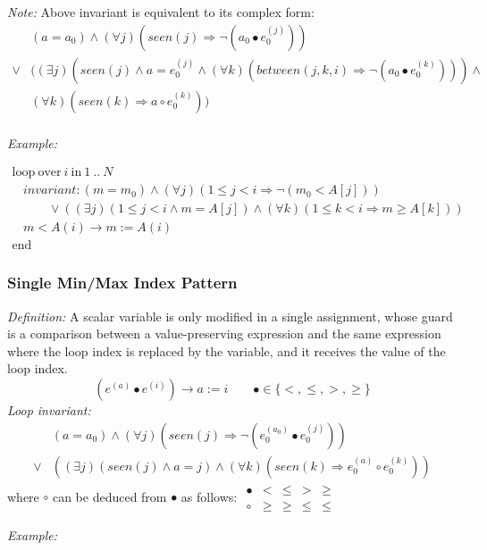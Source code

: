\documentclass[a4paper,10pt]{article}
\newcommand{\idx}{\ensuremath{i}\xspace}
\newcommand{\at}[1]{{(#1)}}
\newcommand{\KWloop}{\ensuremath{\mathrm{loop}~}}
\newcommand{\KWend}{\ensuremath{\mathrm{end}~}}
\newcommand{\KWover}{\ensuremath{\mathrm{over}~}}
\newcommand{\KWin}{\ensuremath{~\mathrm{in}~}}
\newcommand{\impl}{\ensuremath{\Longrightarrow}}
\newcommand{\seen}[1]{\ensuremath{\mathit{seen}(#1)}\xspace}
\newcommand{\between}[3]{\ensuremath{\mathit{between}{(#1,#2,#3)}}\xspace}
\newcommand{\loopinvariant}{\noindent\textit{Loop invariant:}\xspace}
\newcommand{\patterndef}{\noindent\textit{Definition:}\xspace}
\newcommand{\patternexample}{\noindent\textit{Example:}\xspace}
\newcommand{\patternnote}{\noindent\textit{Note:}\xspace}
\begin{document}
\bigskip
\patternnote Above invariant is equivalent to its complex form:
\begin{eqnarray*}
&(a = a_0) \land (\forall j)(\seen{j} \impl \neg (a_0 \bullet e_0^\at{j}))\\
\lor 
& ((\exists j)(\seen{j} \land a = e_0^\at{j} \land (\forall k)(\between{j}{k}{i} \impl \neg (a_0 \bullet e_0^\at{k}))) \land \\
&(\forall k)(\seen{k} \impl a \circ e_0^\at{k}))\\
\end{eqnarray*}

\bigskip
\patternexample

\medskip
$\begin{array}{l}
  \KWloop \KWover i \KWin 1~..~N \\
  ~~~~ \textit{invariant}: (m = m_0) \land (\forall j)(1\leq j < i \impl \neg (m_0 < A[j]))\\
  ~~~~~~~~~~~~~ \lor ((\exists j)(1\leq j < i \land m = A[j]) \land (\forall k)(1\leq k < i \impl m \geq A[k]))\\
  ~~~~ m < A(i) \rightarrow m := A(i)\\
  \KWend
\end{array}$

\subsubsection*{Single Min/Max Index Pattern}

\patterndef A scalar variable is only modified in a single assignment, whose
guard is a comparison between a value-preserving expression and the same expression
where the loop index is replaced by the variable, and it receives the value of
the loop index.
%
$$(e^\at{a} \bullet e^\at{\idx}) \rightarrow a := \idx  \qquad \bullet \in \{<, \leq, >, \geq \}$$
%
\loopinvariant
%
\begin{eqnarray*}
&(a = a_0) \land (\forall j)(\seen{j} \impl \neg (e_0^\at{a_0} \bullet e_0^\at{j}))\\
\lor 
& ((\exists j)(\seen{j} \land a = j) \land (\forall k)(\seen{k} \impl e_0^\at{a} \circ e_0^\at{k}))
\end{eqnarray*}
where $\circ$ can be deduced from $\bullet$ as follows:
$\begin{array}{l|llll}
\bullet & <    & \leq & >    & \geq \\ \hline
\circ   & \geq & \geq & \leq & \leq
\end{array}$

\bigskip
\patternexample
\end{document}
